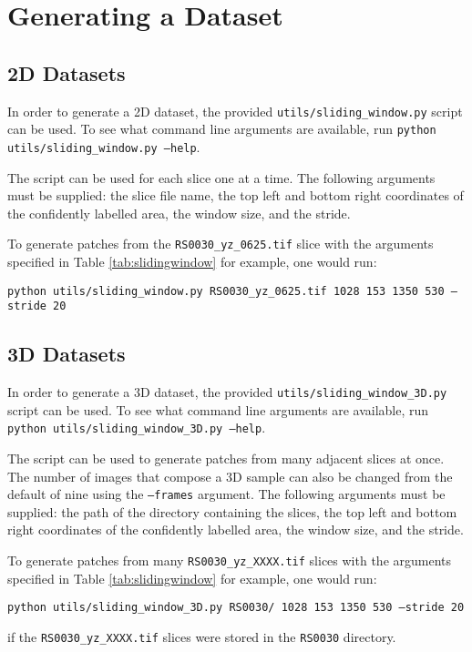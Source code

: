 \section{Generating a Dataset}

\subsection{2D Datasets}

In order to generate a 2D dataset, the provided \texttt{utils/sliding\_window.py} script can be used. To see what command line arguments are available, run \texttt{python utils/sliding\_window.py --help}.

The script can be used for each slice one at a time. The following arguments must be supplied: the slice file name, the top left and bottom right coordinates of the confidently labelled area, the window size, and the stride.

To generate patches from the \texttt{RS0030\_yz\_0625.tif} slice with the arguments specified in Table \ref{tab:slidingwindow} for example, one would run:

\texttt{python utils/sliding\_window.py RS0030\_yz\_0625.tif 1028 153 1350 530 --stride 20}

\subsection{3D Datasets}

In order to generate a 3D dataset, the provided \texttt{utils/sliding\_window\_3D.py} script can be used. To see what command line arguments are available, run \texttt{python utils/sliding\_window\_3D.py --help}.

The script can be used to generate patches from many adjacent slices at once. The number of images that compose a 3D sample can also be changed from the default of nine using the \texttt{--frames} argument. The following arguments must be supplied: the path of the directory containing the slices, the top left and bottom right coordinates of the confidently labelled area, the window size, and the stride.

To generate patches from many \texttt{RS0030\_yz\_XXXX.tif} slices with the arguments specified in Table \ref{tab:slidingwindow} for example, one would run:

\texttt{python utils/sliding\_window\_3D.py RS0030/ 1028 153 1350 530 --stride 20}

if the \texttt{RS0030\_yz\_XXXX.tif} slices were stored in the \texttt{RS0030} directory.

